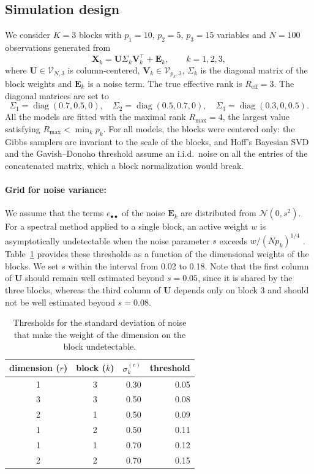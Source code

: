 \documentclass[11pt]{article}
\DeclareMathOperator{\diag}{diag}
\newcommand{\X}{\mathbf{X}}
\newcommand{\U}{\mathbf{U}}
\newcommand{\V}{\mathbf{V}}
\newcommand{\EE}{\mathbf{E}}
\newcommand{\Stiefel}[2]{\mathcal V_{#1,#2}}
\begin{document}
\subsection{Simulation design}
We consider $K=3$ blocks with $p_1=10$, $p_2=5$, $p_3=15$ variables and $N=100$ observations generated from
\[
  \X_k=\U\Sigma_k\V_k^\intercal+\EE_k,\qquad k=1,2,3,
\]
where $\U\in\Stiefel{N}{3}$ is column-centered, $\V_k\in\Stiefel{p_k}{3}$, $\Sigma_k$ is the diagonal matrix of the block weights and $\EE_k$ is a noise term. The true effective rank is $R_{\mathrm{eff}}=3$. The diagonal matrices are set to 
\[\Sigma_1=\diag(0.7,0.5,0), \quad \Sigma_2=\diag(0.5,0.7,0), \quad \Sigma_3=\diag(0.3,0,0.5).\] 
All the models are fitted with the maximal rank $R_{\max}=4$, the largest value satisfying $R_{\max}<\min_kp_k$. For all models, the blocks were centered only: the Gibbs samplers are invariant to the scale of the blocks, and Hoff's Bayesian SVD and the Gavish--Donoho threshold assume an i.i.d.\ noise on all the entries of the concatenated matrix, which a block normalization would break.
 
\paragraph{Grid for noise variance:} We assume that the terms $e_{\bullet\bullet}$ of the noise $\EE_k$ are distributed from $\mathcal{N}(0,s^2)$. For a spectral method applied to a single block, an active weight $w$ is asymptotically undetectable when the noise parameter $s$ exceeds $w/(Np_k)^{1/4}$ \cite[see][for details]{benaychgeorges2012}. Table~\ref{tab:thres} provides these thresholds as a function of the dimensional weights of the blocks. We set $s$ within the interval from 0.02 to 0.18. Note that the first column of $\U$ should remain well estimated beyond $s=0.05$, since it is shared by the three blocks, whereas the third column of $\U$ depends only on block 3 and should not be well estimated beyond $s=0.08$.    

\begin{table}[ht]
\centering
\begin{tabular}{ccrr}
  \hline
dimension ($r$) & block ($k$) & $\sigma_k^{(r)}$ & threshold \\ 
  \hline
1 & 3 & 0.30 & 0.05 \\ 
  3 & 3 & 0.50 & 0.08 \\ 
  2 & 1 & 0.50 & 0.09 \\ 
  1 & 2 & 0.50 & 0.11 \\ 
  1 & 1 & 0.70 & 0.12 \\ 
  2 & 2 & 0.70 & 0.15 \\ 
   \hline
\end{tabular}
\caption{Thresholds for the standard deviation of noise that make the weight of the dimension on the block undetectable.\label{tab:thres}}
\end{table}
\end{document}
